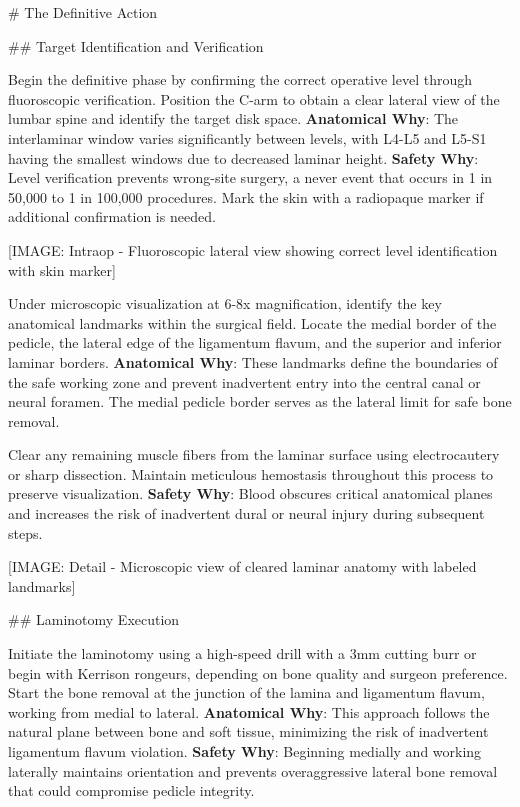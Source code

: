 \documentclass[12pt,a4paper]{article}
\begin{document}
\# The Definitive Action

\#\# Target Identification and Verification

Begin the definitive phase by confirming the correct operative level through fluoroscopic verification. Position the C-arm to obtain a clear lateral view of the lumbar spine and identify the target disk space. \textbf{Anatomical Why}: The interlaminar window varies significantly between levels, with L4-L5 and L5-S1 having the smallest windows due to decreased laminar height. \textbf{Safety Why}: Level verification prevents wrong-site surgery, a never event that occurs in 1 in 50,000 to 1 in 100,000 procedures. Mark the skin with a radiopaque marker if additional confirmation is needed.

[IMAGE: Intraop - Fluoroscopic lateral view showing correct level identification with skin marker]

Under microscopic visualization at 6-8x magnification, identify the key anatomical landmarks within the surgical field. Locate the medial border of the pedicle, the lateral edge of the ligamentum flavum, and the superior and inferior laminar borders. \textbf{Anatomical Why}: These landmarks define the boundaries of the safe working zone and prevent inadvertent entry into the central canal or neural foramen. The medial pedicle border serves as the lateral limit for safe bone removal.

Clear any remaining muscle fibers from the laminar surface using electrocautery or sharp dissection. Maintain meticulous hemostasis throughout this process to preserve visualization. \textbf{Safety Why}: Blood obscures critical anatomical planes and increases the risk of inadvertent dural or neural injury during subsequent steps.

[IMAGE: Detail - Microscopic view of cleared laminar anatomy with labeled landmarks]

\#\# Laminotomy Execution

Initiate the laminotomy using a high-speed drill with a 3mm cutting burr or begin with Kerrison rongeurs, depending on bone quality and surgeon preference. Start the bone removal at the junction of the lamina and ligamentum flavum, working from medial to lateral. \textbf{Anatomical Why}: This approach follows the natural plane between bone and soft tissue, minimizing the risk of inadvertent ligamentum flavum violation. \textbf{Safety Why}: Beginning medially and working laterally maintains orientation and prevents overaggressive lateral bone removal that could compromise pedicle integrity.
\end{document}
